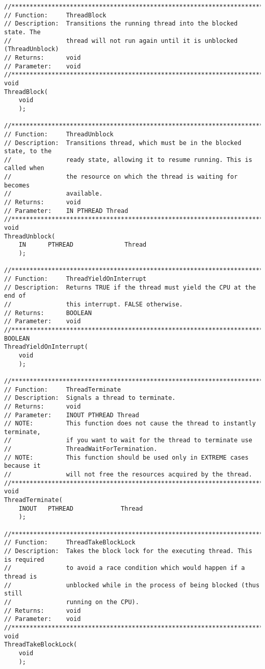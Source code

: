 \begin{appendices}
\begin{lstlisting}[caption={Thread Private Interface},label={lst:ThPrivateFuncs}]
//******************************************************************************
// Function:     ThreadBlock
// Description:  Transitions the running thread into the blocked state. The
//               thread will not run again until it is unblocked (ThreadUnblock)
// Returns:      void
// Parameter:    void
//******************************************************************************
void
ThreadBlock(
    void
    );

//******************************************************************************
// Function:     ThreadUnblock
// Description:  Transitions thread, which must be in the blocked state, to the
//               ready state, allowing it to resume running. This is called when
//               the resource on which the thread is waiting for becomes
//               available.
// Returns:      void
// Parameter:    IN PTHREAD Thread
//******************************************************************************
void
ThreadUnblock(
    IN      PTHREAD              Thread
    );

//******************************************************************************
// Function:     ThreadYieldOnInterrupt
// Description:  Returns TRUE if the thread must yield the CPU at the end of
//               this interrupt. FALSE otherwise.
// Returns:      BOOLEAN
// Parameter:    void
//******************************************************************************
BOOLEAN
ThreadYieldOnInterrupt(
    void
    );

//******************************************************************************
// Function:     ThreadTerminate
// Description:  Signals a thread to terminate.
// Returns:      void
// Parameter:    INOUT PTHREAD Thread
// NOTE:         This function does not cause the thread to instantly terminate,
//               if you want to wait for the thread to terminate use
//               ThreadWaitForTermination.
// NOTE:         This function should be used only in EXTREME cases because it
//               will not free the resources acquired by the thread.
//******************************************************************************
void
ThreadTerminate(
    INOUT   PTHREAD             Thread
    );

//******************************************************************************
// Function:     ThreadTakeBlockLock
// Description:  Takes the block lock for the executing thread. This is required
//               to avoid a race condition which would happen if a thread is
//               unblocked while in the process of being blocked (thus still
//               running on the CPU).
// Returns:      void
// Parameter:    void
//******************************************************************************
void
ThreadTakeBlockLock(
    void
    );


\end{lstlisting}
\end{appendices}
